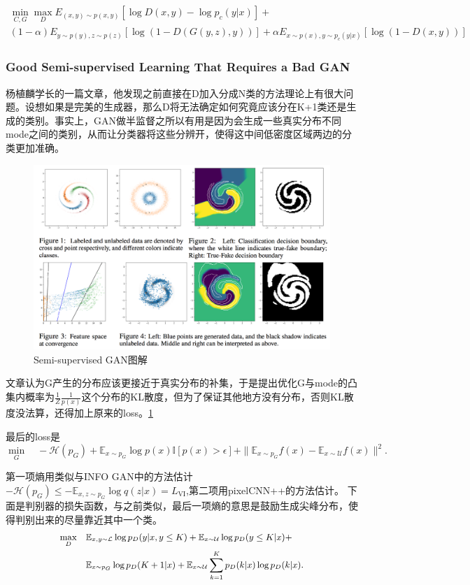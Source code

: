 \documentclass[a4paper]{article}
\begin{document}
\begin{multline}
\min\limits_{C,G}\max\limits_D E_{(x,y)\sim p(x,y)}[\log D(x,y) - \log p_c(y|x)] +\\(1-\alpha)E_{y\sim p(y),z\sim p(z)}[\log(1-D(G(y,z), y))] + \alpha E_{x\sim p(x),y\sim p_c(y|x)}[\log (1 - D(x,y))]\nonumber
\end{multline}
\subsubsection{Good Semi-supervised Learning That Requires a Bad GAN\cite{DBLP:journals/corr/DaiYYCS17}}
杨植麟学长的一篇文章，他发现之前直接在D加入分成N类的方法理论上有很大问题。设想如果是完美的生成器，那么D将无法确定如何究竟应该分在K+1类还是生成的类别。事实上，GAN做半监督之所以有用是因为会生成一些真实分布不同mode之间的类别，从而让分类器将这些分辨开，使得这中间低密度区域两边的分类更加准确。
\begin{figure}
\centering
\includegraphics[width=\textwidth]{./img/33.png}
\caption{Semi-supervised GAN图解}
\label{fig:33}
\end{figure}
文章认为G产生的分布应该更接近于真实分布的补集，于是提出优化G与mode的凸集内概率为$\frac{1}{Z}\frac{1}{p(x)}$这个分布的KL散度，但为了保证其他地方没有分布，否则KL散度没法算，还得加上原来的loss。\ref{fig:33}

最后的loss是$$\min_G \quad -\mathcal{H}(p_G) + \mathbb{E}_{x \sim p_G} \log p(x) \mathbb{I}[p(x) > \epsilon]  + \|\mathbb{E}_{x \sim p_G} f(x) - \mathbb{E}_{x \sim \mathcal{U}} f(x)\|^2.
$$

第一项熵用类似与INFO GAN中的方法估计$-\mathcal{H}(p_G) \leq - \mathbb{E}_{x, z \sim p_G} \log q(z | x) = L_\text{VI}$,第二项用pixelCNN++\cite{DBLP:journals/corr/SalimansKCK17}的方法估计。
下面是判别器的损失函数，与之前类似，最后一项熵的意思是鼓励生成尖峰分布，使得判别出来的尽量靠近其中一个类。
\begin{equation}
\small
\begin{aligned}
\max_{D} \quad
& \mathbb{E}_{x, y \sim \mathcal{L}} \log p_D(y | x, y \leq K) + \mathbb{E}_{x \sim \mathcal{U}} \log p_D(y \leq K | x) + \\
& \mathbb{E}_{x \sim p_G} \log p_D(K + 1 | x)  + \mathbb{E}_{x \sim \mathcal{U}} \sum_{k = 1}^K p_D(k | x) \log p_D(k | x).
\label{eq:d_full}
\end{aligned}
\end{equation}
\end{document}
